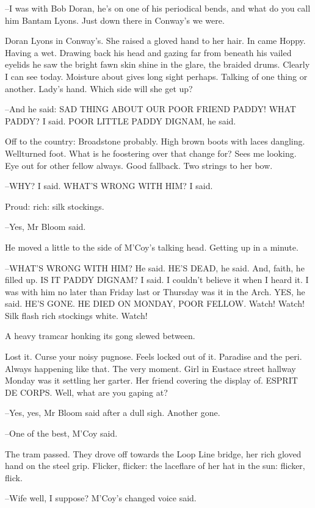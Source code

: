 --I was with Bob Doran, he's on one of his periodical bends, and what do
you call him Bantam Lyons. Just down there in Conway's we were.

Doran Lyons in Conway's. She raised a gloved hand to her hair. In came
Hoppy. Having a wet. Drawing back his head and gazing far from beneath
his vailed eyelids he saw the bright fawn skin shine in the glare, the
braided drums. Clearly I can see today. Moisture about gives long sight
perhaps. Talking of one thing or another. Lady's hand. Which side will
she get up?

--And he said: SAD THING ABOUT OUR POOR FRIEND PADDY! WHAT PADDY? I said.
POOR LITTLE PADDY DIGNAM, he said.

Off to the country: Broadstone probably. High brown boots with laces
dangling. Wellturned foot. What is he foostering over that change for?
Sees me looking. Eye out for other fellow always. Good fallback. Two
strings to her bow.

--WHY? I said. WHAT'S WRONG WITH HIM? I said.

Proud: rich: silk stockings.

--Yes, Mr Bloom said.

He moved a little to the side of M'Coy's talking head. Getting up in a
minute.

--WHAT'S WRONG WITH HIM? He said. HE'S DEAD, he said. And, faith, he
filled up. IS IT PADDY DIGNAM? I said. I couldn't believe it when I heard
it. I was with him no later than Friday last or Thursday was it in the
Arch. YES, he said. HE'S GONE. HE DIED ON MONDAY, POOR FELLOW. Watch!
Watch! Silk flash rich stockings white. Watch!

A heavy tramcar honking its gong slewed between.

Lost it. Curse your noisy pugnose. Feels locked out of it. Paradise and
the peri. Always happening like that. The very moment. Girl in Eustace
street hallway Monday was it settling her garter. Her friend covering the
display of. ESPRIT DE CORPS. Well, what are you gaping at?

--Yes, yes, Mr Bloom said after a dull sigh. Another gone.

--One of the best, M'Coy said.

The tram passed. They drove off towards the Loop Line bridge, her rich
gloved hand on the steel grip. Flicker, flicker: the laceflare of her hat
in the sun: flicker, flick.

--Wife well, I suppose? M'Coy's changed voice said.

